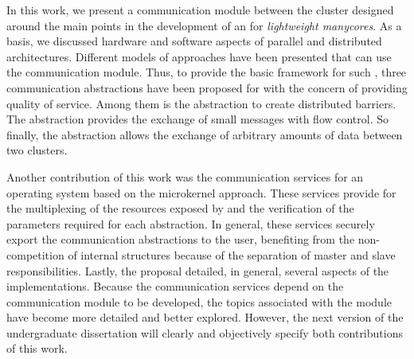 In this work, we present a communication module between the cluster
designed around the main points in the development of an \os for \textit{lightweight manycores}.
As a basis, we discussed hardware and software aspects of parallel
and distributed architectures.
Different models of \os approaches have been presented that can
use the communication module.
Thus, to provide the basic framework for such \oses, three
communication abstractions have been proposed for \hal with the
concern of providing quality of service.
Among them is the \sync abstraction to create distributed barriers.
The \mailbox abstraction provides the exchange of small messages
with flow control.
So finally, the \portal abstraction allows the exchange of
arbitrary amounts of data between two clusters.

Another contribution of this work was the communication services
for an operating system based on the microkernel approach.
These services provide for the multiplexing of the resources
exposed by \hal and the verification of the parameters required
for each abstraction.
In general, these services securely export the communication
abstractions to the user, benefiting from the non-competition
of \os internal structures because of the separation of master
and slave responsibilities.
Lastly, the proposal detailed, in general, several aspects of
the implementations.
Because the communication services depend on the \hal communication
module to be developed, the topics associated with
the module have become more detailed and better explored.
However, the next version of the undergraduate dissertation
will clearly and objectively specify both contributions of this work.
